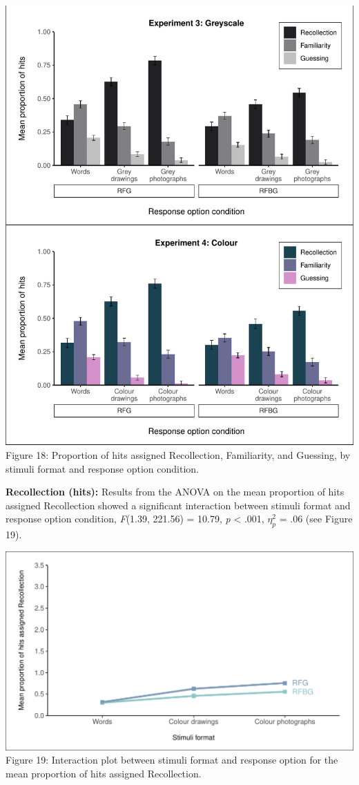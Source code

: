 \documentclass[
  11pt,
]{article}
\begin{document}
\includegraphics{R--Thesis_files/figure-latex/unnamed-chunk-63-1.pdf}
Figure 18: Proportion of hits assigned Recollection, Familiarity, and
Guessing, by stimuli format and response option condition.

\textbf{Recollection (hits):} Results from the ANOVA on the mean
proportion of hits assigned Recollection showed a significant
interaction between stimuli format and response option condition,
\emph{F}(1.39, 221.56) = 10.79, \emph{p} \textless{} .001, \(\eta^2_p\)
= .06 (see Figure 19).

\includegraphics{R--Thesis_files/figure-latex/unnamed-chunk-65-1.pdf}
Figure 19: Interaction plot between stimuli format and response option
for the mean proportion of hits assigned Recollection.
\end{document}
